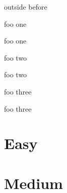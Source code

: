 \documentclass{article}
\begin{document}
\begin{exercise}
  outside before
\end{exercise}

\begin{exercise}[difficulty=easy,points=1]
  foo one \lipsum[4]
\end{exercise}
\begin{solution}
  foo one \lipsum[4]
\end{solution}
\begin{exercise}[difficulty=medium,points=1]
  foo two \lipsum[4]
\end{exercise}
\begin{solution}
  foo two \lipsum[4]
\end{solution}
\begin{exercise}[difficulty=easy,points=1]
  foo three \lipsum[4]
\end{exercise}
\begin{solution}
  foo three \lipsum[4]
\end{solution}

\section{Easy}

\section{Medium}

\printsolutions[difficulty=medium]
\end{document}
